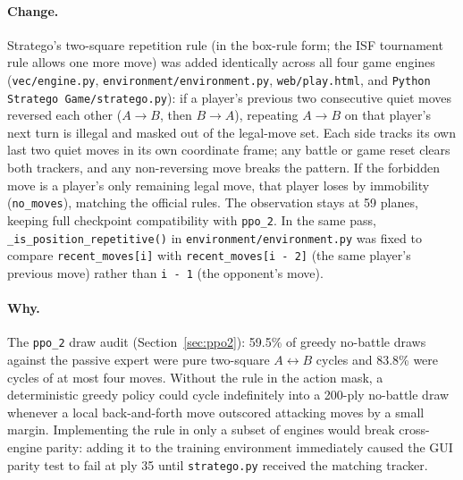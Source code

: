 \paragraph{Change.} Stratego's two-square repetition rule (in the box-rule form; the ISF tournament
rule allows one more move) was added identically across all
four game engines (\texttt{vec/engine.py}, \texttt{environment/environment.py},
\texttt{web/play.html}, and \texttt{Python Stratego Game/stratego.py}): if a player's previous two
consecutive quiet moves reversed each other ($A \to B$, then $B \to A$), repeating $A \to B$ on
that player's next turn is illegal and masked out of the legal-move set. Each side tracks its own
last two quiet moves in its own coordinate frame; any battle or game reset clears both trackers,
and any non-reversing move breaks the pattern. If the forbidden move is a player's only remaining
legal move, that player loses by immobility (\texttt{no\_moves}), matching the official rules. The
observation stays at 59 planes, keeping full checkpoint compatibility with \texttt{ppo\_2}. In the
same pass, \texttt{\_is\_position\_repetitive()} in \texttt{environment/environment.py} was fixed
to compare \texttt{recent\_moves[i]} with \texttt{recent\_moves[i - 2]} (the same player's
previous move) rather than \texttt{i - 1} (the opponent's move).

\paragraph{Why.} The \texttt{ppo\_2} draw audit (Section~\ref{sec:ppo2}): 59.5\% of greedy
no-battle draws against the passive expert were pure two-square $A \leftrightarrow B$ cycles and
83.8\% were cycles of at most four moves. Without the rule in the action mask, a deterministic
greedy policy could cycle indefinitely into a 200-ply no-battle draw whenever a local back-and-forth
move outscored attacking moves by a small margin. Implementing the rule in only a subset of engines
would break cross-engine parity: adding it to the training environment immediately caused the GUI
parity test to fail at ply 35 until \texttt{stratego.py} received the matching tracker.

